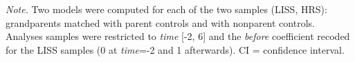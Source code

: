 \documentclass[
  english,
  man, noextraspace]{apa7}
\newenvironment{lltable}{\begin{landscape}\begin{center}\begin{ThreePartTable}}{\end{ThreePartTable}\end{center}\end{landscape}}
\begin{document}
\begin{appendix}
\begin{lltable}
{}

\end{lltable}











\begin{lltable}

\begin{TableNotes}[para]
\normalsize{\textit{Note.} Two models were computed for each of the
two samples (LISS, HRS): grandparents matched with parent controls and
with nonparent controls. Analyses samples were restricted to \emph{time}
{[}-2, 6{]} and the \emph{before} coefficient recoded for the LISS
samples (0 at \emph{time}=-2 and 1 afterwards). CI = confidence
interval.}
\end{TableNotes}

\footnotesize{

}
\end{lltable}
\end{appendix}
\end{document}
